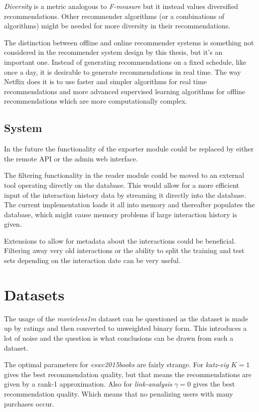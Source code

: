 \textit{Diversity}
is a metric analogous to \textit{F-measure} but it instead values diversified recommendations. Other recommender algorithms (or a combinations of algorithms) might be needed for more diversity in their recommendations.

The distinction between offline and online recommender systems is something not considered in the recommender system design by this thesis, but it's an important one. Instead of generating recommendations on a fixed schedule, like once a day, it is desirable to generate recommendations in real time. The way Netflix does it is to use faster and simpler algorithms for real time recommendations and more advanced supervised learning algorithms for offline recommendations which are more computationally complex.

\subsection{System}

In the future the functionality of the exporter module could be replaced by either the remote API or the admin web interface.

The filtering functionality in the reader module could be moved to an external tool operating directly on the database. This would allow for a more efficient input of the interaction history data by streaming it directly into the database. The current implementation loads it all into memory and thereafter populates the database, which might cause memory problems if large interaction history is given.

Extensions to allow for metadata about the interactions could be beneficial. Filtering away very old interactions or the ability to split the training and test sets depending on the interaction date can be very useful.


\section{Datasets}

The usage of the \textit{movielens1m} dataset can be questioned as the dataset is made up by ratings and then converted to unweighted binary form. This introduces a lot of noise and the question is what conclusions can be drawn from such a dataset.

The optimal parameters for \textit{eswc2015books} are fairly strange. For \textit{katz-eig} $K = 1$ gives the best recommendation quality, but that means the recommendations are given by a rank-1 approximation. Also for \textit{link-analysis} $\gamma = 0$ gives the best recommendation quality. Which means that no penalizing users with many purchases occur.


